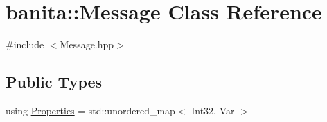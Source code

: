 \hypertarget{classbanita_1_1_message}{}\section{banita\+::Message Class Reference}
\label{classbanita_1_1_message}


{\ttfamily \#include $<$Message.\+hpp$>$}

\subsection*{Public Types}
\begin{DoxyCompactItemize}
\item 
using \mbox{\hyperlink{classbanita_1_1_message_ab38626a5034f095bf7d856e95ab89290}{Properties}} = std\+::unordered\+\_\+map$<$ Int32, Var $>$
\end{DoxyCompactItemize}
